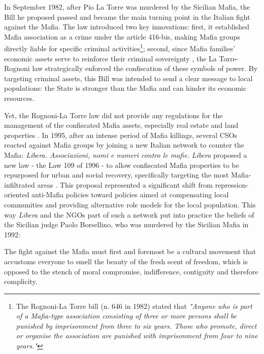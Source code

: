 \documentclass[12pt]{article}
\theoremstyle{plain}
\theoremstyle{plain}
\theoremstyle{plain}
\theoremstyle{definition}
\theoremstyle{plain}
\theoremstyle{definition}
\theoremstyle{plain}
\theoremstyle{remark}
\theoremstyle{definition}
\theoremstyle{definition}
\theoremstyle{plain}
\begin{document}
\normalsize
In September 1982, after Pio La Torre was murdered by the Sicilian Mafia, the Bill he proposed passed and became the main turning point in the Italian fight against the Mafia. The law introduced two key innovations: first, it established Mafia association as a crime under the article 416-bis, making Mafia groups directly liable for specific criminal activities\footnote{The Rognoni-La Torre bill (n. 646 in 1982) stated that \emph{"Anyone who is part of a Mafia-type association consisting of three or more persons shall be punished by imprisonment from three to six years. Those who promote, direct or organise the association are punished with imprisonment from four to nine years."}}; second, since Mafia families' economic assets serve to reinforce their criminal sovereignty \citep{operti_tough_2018, mosca_social_2017}, the La Torre-Rognoni law strategically enforced the confiscation of these symbols of power. By targeting criminal assets, this Bill was intended to send a clear message to local populations: the State is stronger than the Mafia and can hinder its economic resources.  \par
\medskip
Yet, the Rognoni-La Torre law did not provide any regulations for the management of the confiscated Mafia assets, especially real estate and land properties \citep{menditto_quale_2013, nazzaro_il_2021}.
In 1995, after an intense period of Mafia killings, several CSOs reacted against Mafia groups by joining a new Italian network to counter the Mafia: \emph{Libera. Associazioni, nomi e numeri contro le mafie.} \emph{Libera} proposed a new law - the Law 109 of 1996 - to allow confiscated Mafia properties to be repurposed for urban and social recovery, specifically targeting the most Mafia-infiltrated areas \citep{nazzaro_il_2021, falcone_beneitalia_2016}. This proposal represented a significant shift from repression-oriented anti-Mafia policies toward policies aimed at compensating local communities and providing alternative role models for the local population. This way \emph{Libera} and the NGOs part of such a network put into practice the beliefs of the Sicilian judge Paolo Borsellino, who was murdered by the Sicilian Mafia in 1992: \par
\vspace{0.3cm}

\small %
The fight against the Mafia must first and foremost be a cultural movement that accustoms everyone to smell the beauty of the fresh scent of freedom, which is opposed to the stench of moral compromise, indifference, contiguity and therefore complicity.
\end{document}

